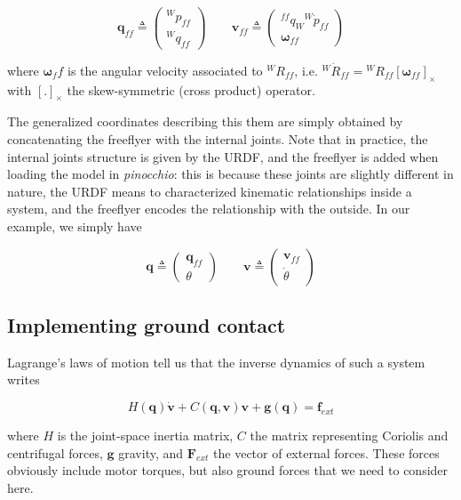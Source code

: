 \documentclass[a4paper,11pt]{article}
\begin{document}
\begin{equation}
	\bm q_{ff} \triangleq \begin{pmatrix} {}^W p_{ff} \\ {}^W q_{ff} \end{pmatrix} \qquad
	\bm v_{ff} \triangleq \begin{pmatrix} {}^{ff} q_W {}^W \dot{p}_{ff} \\ \bm \omega_{ff} \end{pmatrix} 
\end{equation} 

where $\bm \omega_ff$ is the angular velocity associated to ${}^W R_{ff}$, i.e. ${}^W \dot{R}_{ff} = {}^W R_{ff} [\bm \omega_{ff}]_\times$ with $[.]_\times$ the skew-symmetric (cross product) operator.

\medskip

The generalized coordinates describing this them are simply obtained by concatenating the freeflyer with the internal joints. Note that in practice, the internal joints structure is given by the URDF, and the freeflyer is added when loading the model in \emph{pinocchio}: this is because these joints are slightly different in nature, the URDF means to characterized kinematic relationships inside a system, and the freeflyer encodes the relationship with the outside. In our example, we simply have


\begin{equation}
\bm q \triangleq \begin{pmatrix} \bm q_{ff} \\ \theta \end{pmatrix} \qquad
\bm v \triangleq \begin{pmatrix} \bm v_{ff} \\ \dot{\theta} \end{pmatrix}
\end{equation} 

\subsection{Implementing ground contact}

Lagrange's laws of motion tell us that the inverse dynamics of such a system writes

\begin{equation}
	H(\bm q) \dot{\bm v} + C(\bm q, \bm v) \bm v + \bm g(\bm q) = \bm f_{ext}
	\label{eqInverseDynamics}
\end{equation} 

where $H$ is the joint-space inertia matrix, $C$ the matrix representing Coriolis and centrifugal forces, $\bm g$ gravity, and $\bm F_{ext}$ the vector of external forces. These forces obviously include motor torques, but also ground forces that we need to consider here.
\end{document}
